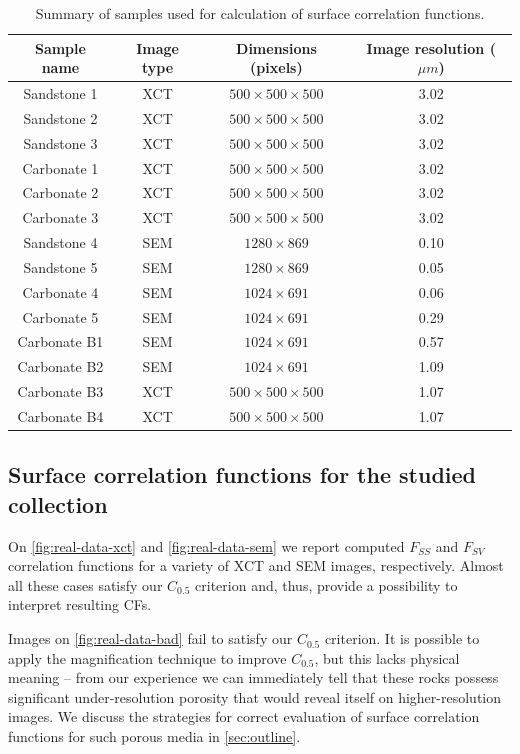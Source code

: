 \documentclass[reprint,amsmath,amssymb,aps,pre,showkeys,showpacs]{revtex4-1}
\begin{document}
\begin{table}[!pt]
  \centering
  \begin{ruledtabular}
    \begin{tabular}{|c|c|c|c|}
      Sample name & Image type & Dimensions (pixels) & Image resolution ($\mu m$) \\
      \hline
      Sandstone 1 & XCT & $500 \times 500 \times 500$ & 3.02 \\
      Sandstone 2 & XCT & $500 \times 500 \times 500$ & 3.02 \\
      Sandstone 3 & XCT & $500 \times 500 \times 500$ & 3.02 \\
      Carbonate 1 & XCT & $500 \times 500 \times 500$ & 3.02 \\
      Carbonate 2 & XCT & $500 \times 500 \times 500$ & 3.02 \\
      Carbonate 3 & XCT & $500 \times 500 \times 500$ & 3.02 \\
      Sandstone 4 & SEM &  $1280 \times 869$ & 0.10 \\
      Sandstone 5 & SEM &  $1280 \times 869$ & 0.05 \\
      Carbonate 4 & SEM &  $1024 \times 691$ & 0.06 \\
      Carbonate 5 & SEM &  $1024 \times 691$ & 0.29 \\
      Carbonate B1 & SEM & $1024 \times 691$ & 0.57 \\
      Carbonate B2 & SEM & $1024 \times 691$ & 1.09 \\
      Carbonate B3 & XCT & $500 \times 500 \times 500$ & 1.07 \\
      Carbonate B4 & XCT & $500 \times 500 \times 500$ & 1.07
    \end{tabular}
  \end{ruledtabular}
  \caption{Summary of samples used for calculation of surface correlation
    functions.}
  \label{tab:samples}
\end{table}

\subsection{Surface correlation functions for the studied collection}
On \cref{fig:real-data-xct} and \cref{fig:real-data-sem} we report computed
$F_{SS}$ and $F_{SV}$ correlation functions for a variety of XCT and SEM images,
respectively. Almost all these cases satisfy our $C_{0.5}$ criterion and, thus,
provide a possibility to interpret resulting CFs.

Images on \cref{fig:real-data-bad} fail to satisfy our $C_{0.5}$ criterion. It is
possible to apply the magnification technique to improve $C_{0.5}$, but this
lacks physical meaning -- from our experience we can immediately tell that these
rocks possess significant under-resolution porosity that would reveal itself on
higher-resolution images. We discuss the strategies for correct evaluation of
surface correlation functions for such porous media in \cref{sec:outline}.
\end{document}
